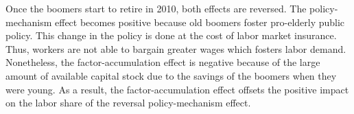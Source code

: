 Once the boomers start to retire in 2010, both effects are reversed. The policy-mechanism effect becomes positive because old boomers foster pro-elderly public policy. This change in the policy is done at the cost of labor market insurance. Thus, workers are not able to bargain greater wages which fosters labor demand. Nonetheless, the factor-accumulation effect is negative because of the large amount of available capital stock due to the savings of the boomers when they were young. As a result, the factor-accumulation effect offsets the positive impact on the labor share of the reversal policy-mechanism effect.


